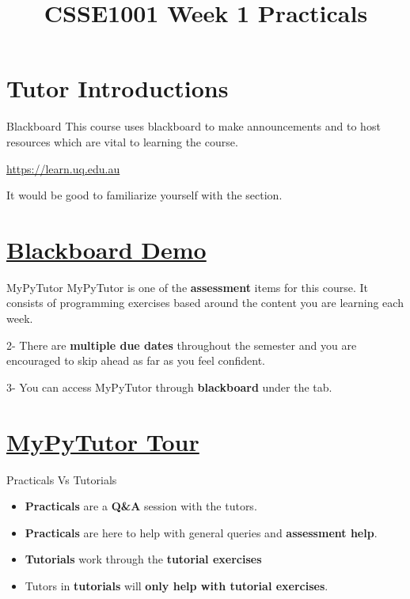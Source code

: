 \documentclass[week1]{csse1001}
\title{CSSE1001 Week 1 Practicals}
\begin{document}
\begin{frame} 
\maketitle
\end{frame}

\section{Tutor Introductions}

\begin{topic}{Blackboard}
This course uses blackboard to make announcements and to host resources which
are vital to learning the course.

\url{https://learn.uq.edu.au}

It would be good to familiarize yourself with the 
section.
\end{topic}

\section{\href{https://learn.uq.edu.au}{Blackboard Demo}}

\begin{topic}{MyPyTutor}
MyPyTutor is one of the \textbf{assessment} items for this course. It consists of
programming exercises based around the content you are learning each week.

\begin{subtopic}{2-}
There are \textbf{multiple due dates} throughout the semester and you are encouraged
to skip ahead as far as you feel confident.
\end{subtopic}

\begin{subtopic}{3-}
You can access MyPyTutor through \textbf{blackboard} under the  tab.
\end{subtopic}
\end{topic}

\section{\href{https://learn.uq.edu.au}{MyPyTutor Tour}}

\begin{topic}{Practicals Vs Tutorials}
\begin{itemize}
	\item \textbf{Practicals} are a \textbf{Q\&A} session with the tutors.
	\item \textbf{Practicals} are here to help with general queries and \textbf{assessment help}.
	\item \textbf{Tutorials} work through the \textbf{tutorial exercises}
	\item Tutors in \textbf{tutorials} will \textbf{only help with tutorial exercises}.
\end{itemize}
\end{topic}
\end{document}
